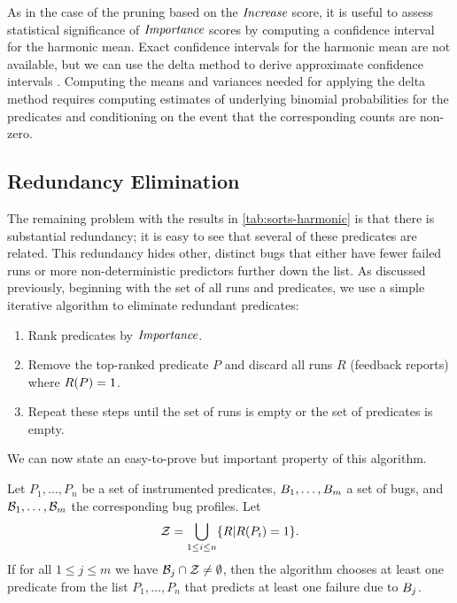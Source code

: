 As in the case of the pruning based on the $\textit{Increase}$ score, it is
useful to assess statistical significance of $\textit{Importance}$ scores
by computing a confidence interval for the harmonic mean.  Exact 
confidence intervals for the harmonic mean are not available, but 
we can use the delta method to derive 
approximate confidence intervals \cite{Lehmann:2003:theory}.
Computing the means and variances 
needed for applying the delta method requires computing estimates of 
underlying binomial probabilities for the predicates and conditioning 
on the event that the corresponding counts are non-zero.  


\subsection{Redundancy Elimination}
\label{sec:elimination}

The remaining problem with the results in \autoref{tab:sorts-harmonic}
is that there is substantial redundancy; it is easy to see that
several of these predicates are related.  This redundancy hides other,
distinct bugs that either have fewer failed runs or more
non-deterministic predictors further down the list.  As discussed
previously, beginning with the set of all runs and predicates, we use
a simple iterative algorithm to eliminate redundant predicates:
\begin{enumerate}

\item Rank predicates by $\textit{Importance}$.

\item Remove the top-ranked predicate $P$ and discard all runs $R$
  (feedback reports) where $R(P) = 1$.

\item Repeat these steps until the set of runs is empty or the set of predicates is empty.
\end{enumerate}

We can now state an easy-to-prove but important property of this algorithm.
\begin{lemma}
\label{lem1}
Let $P_1,\ldots,P_n$ be a set of instrumented predicates, $B_1,\ldots,B_m$
a set of bugs, and $\mathcal{B}_1,\ldots, \mathcal{B}_m$ the corresponding
bug profiles.  Let
\[ {\cal Z} = \bigcup_{1 \leq i \leq n} \{ R | R(P_i) = 1 \} . \]
If for all $1 \leq j \leq m$ we have $\mathcal{B}_j \cap {\cal Z} \neq \emptyset$, then
the algorithm chooses at least one predicate from the list $P_1,\ldots,P_n$ that predicts
at least one failure due to $B_j$.
\end{lemma}

